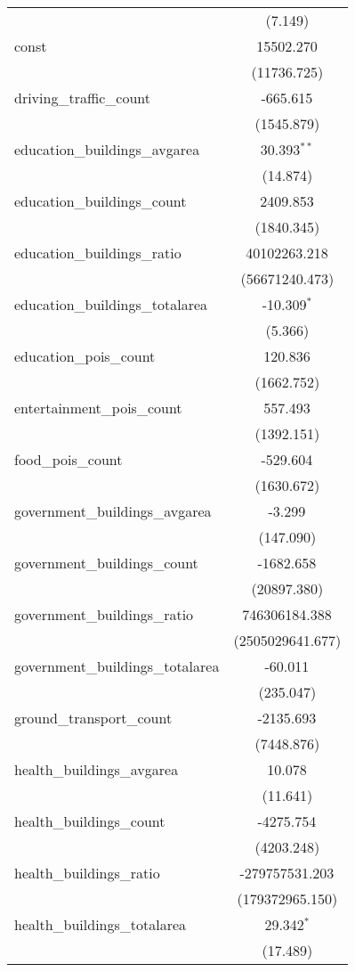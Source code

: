 \begin{table}[!htbp]
\begin{tabular}{@{\extracolsep{5pt}}lc}
  & (7.149) \\
 const & 15502.270$^{}$ \\
  & (11736.725) \\
 driving_traffic_count & -665.615$^{}$ \\
  & (1545.879) \\
 education_buildings_avgarea & 30.393$^{**}$ \\
  & (14.874) \\
 education_buildings_count & 2409.853$^{}$ \\
  & (1840.345) \\
 education_buildings_ratio & 40102263.218$^{}$ \\
  & (56671240.473) \\
 education_buildings_totalarea & -10.309$^{*}$ \\
  & (5.366) \\
 education_pois_count & 120.836$^{}$ \\
  & (1662.752) \\
 entertainment_pois_count & 557.493$^{}$ \\
  & (1392.151) \\
 food_pois_count & -529.604$^{}$ \\
  & (1630.672) \\
 government_buildings_avgarea & -3.299$^{}$ \\
  & (147.090) \\
 government_buildings_count & -1682.658$^{}$ \\
  & (20897.380) \\
 government_buildings_ratio & 746306184.388$^{}$ \\
  & (2505029641.677) \\
 government_buildings_totalarea & -60.011$^{}$ \\
  & (235.047) \\
 ground_transport_count & -2135.693$^{}$ \\
  & (7448.876) \\
 health_buildings_avgarea & 10.078$^{}$ \\
  & (11.641) \\
 health_buildings_count & -4275.754$^{}$ \\
  & (4203.248) \\
 health_buildings_ratio & -279757531.203$^{}$ \\
  & (179372965.150) \\
 health_buildings_totalarea & 29.342$^{*}$ \\
  & (17.489) \\

\end{tabular}
\end{table}
